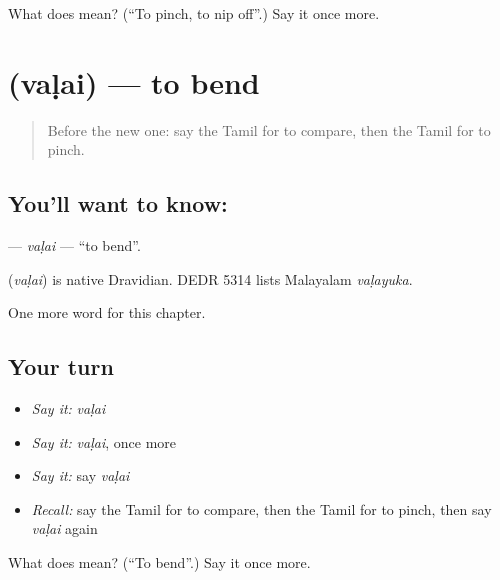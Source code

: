 \begin{tcolorbox}[breakable,colback=teal!4,colframe=teal!35!black,title={Before you move on}]
What does  mean? (\textquotedblleft{}To pinch, to nip off\textquotedblright{}.) Say it once more.
\end{tcolorbox}
\section[\texorpdfstring{\ta{வளை} (vaḷai)}{வளை (vaḷai)}]{ (vaḷai) — to bend}

\label{lesson:TA-C200-valai}



\begin{quote}
Before the new one: say the Tamil for to compare, then the Tamil for to pinch.
\end{quote}

\subsection*{You'll want to know: }
\textbf{} — \emph{vaḷai} — \textquotedblleft{}to bend\textquotedblright{}.

\begin{cousinweb}
\textbf{} (\emph{vaḷai}) is native Dravidian. DEDR 5314 lists Malayalam \emph{vaḷayuka}.
\end{cousinweb}

\begin{grammarlens}[title={What you've built}]
One more word for this chapter.
\end{grammarlens}

\subsection*{Your turn}
\begin{itemize}
\raggedright
  \item \emph{Say it:} \emph{vaḷai}
  \item \emph{Say it:} \emph{vaḷai}, once more
  \item \emph{Say it:} say \emph{vaḷai}
  \item \emph{Recall:} say the Tamil for to compare, then the Tamil for to pinch, then say \emph{vaḷai} again
\end{itemize}

\begin{tcolorbox}[breakable,colback=teal!4,colframe=teal!35!black,title={Before you move on}]
What does  mean? (\textquotedblleft{}To bend\textquotedblright{}.) Say it once more.
\end{tcolorbox}

